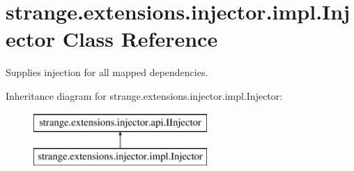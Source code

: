 \hypertarget{classstrange_1_1extensions_1_1injector_1_1impl_1_1_injector}{\section{strange.\-extensions.\-injector.\-impl.\-Injector Class Reference}
\label{classstrange_1_1extensions_1_1injector_1_1impl_1_1_injector}
}


Supplies injection for all mapped dependencies.  


Inheritance diagram for strange.\-extensions.\-injector.\-impl.\-Injector\-:\begin{figure}[H]
\begin{center}
\leavevmode
\includegraphics[height=2.000000cm]{classstrange_1_1extensions_1_1injector_1_1impl_1_1_injector}
\end{center}
\end{figure}
